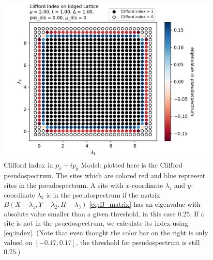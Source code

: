 \documentclass[a4paper]{article}
\begin{document}
\begin{figure}
\centering
\includegraphics[width=.9\textwidth]{figures/pxipy_clifford.png}
\caption{Clifford Index in $p_x + ip_y$ Model: plotted here is the Clifford pseudospectrum.
The sites which are colored red and blue represent sites in the pseudospectrum.
A site with $x$-coordinate $\lambda_1$ and $y$-coordinate $\lambda_2$ is in the pseudospectrum if the matrix $B(X - \lambda_1, Y - \lambda_2, H - \lambda_3)$ \eqref{eq:B_matrix} has an eigenvalue with absolute value smaller than a given threshold, in this case $0.25$.
If a site is not in the psuedospectrum, we calculate its index using \eqref{eq:index}.
(Note that even thought the color bar on the right is only valued on $[-0.17,0.17]$, the threshold for pseudospectrum is still $0.25$.)
}
\label{fig:pxipy_index}%
\end{figure}
\end{document}
